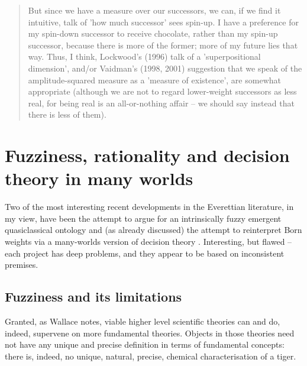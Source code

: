 \documentclass[aps,
pra,epsfig,12pt]{revtex4}
\begin{document}
\begin{quotation} 
But since we have
a measure over our successors, we can, if we find it intuitive, talk of 'how
much successor' sees spin-up. I have a preference for my spin-down successor
to receive chocolate, rather than my spin-up successor, because there is more of
the former; more of my future lies that way. Thus, I think, Lockwood's (1996)
talk of a 'superpositional dimension', and/or Vaidman's (1998, 2001) suggestion
that we speak of the amplitude-squared measure as a 'measure of existence', are
somewhat appropriate (although we are not to regard lower-weight successors
as less real, for being real is an 
all-or-nothing affair -- we should say instead
that there is less of them).
\end{quotation}

\section{Fuzziness, rationality and decision theory in many worlds}

Two of the most interesting recent developments in the Everettian
literature, in my view, have been the attempt to argue for
an intrinsically fuzzy emergent quasiclassical ontology \cite{wallacevolone}
and (as already discussed) the attempt to reinterpret
Born weights via a many-worlds version of 
decision theory \cite{wallacevoltwo}.   
Interesting, but flawed -- 
each project has deep problems, and they appear to be based on
inconsistent premises.   

\subsection{Fuzziness and its limitations}

Granted, as Wallace \cite{wallacevolone} notes, viable higher level scientific 
theories can and do, indeed, supervene on more fundamental theories. 
Objects in those theories need not have any unique and
precise definition in terms of fundamental concepts: 
there is, indeed, no unique, natural, precise, chemical characterisation 
of a tiger. 
\end{document}
